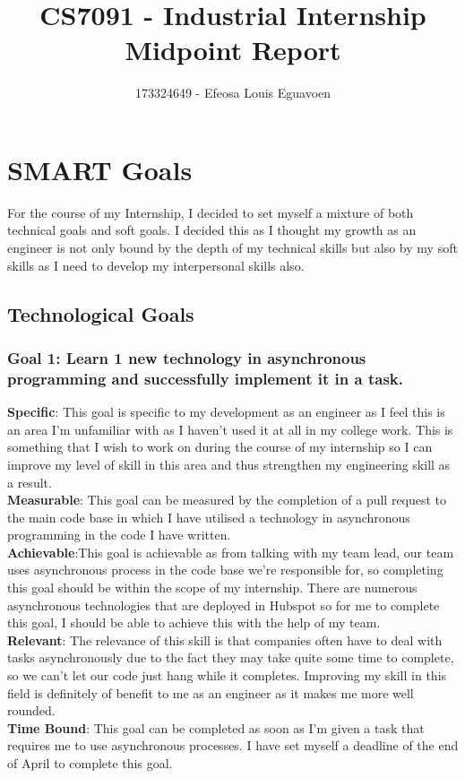 \documentclass[12pt]{article} %
\title{CS7091 - Industrial Internship Midpoint Report}
\author{173324649 - Efeosa Louis Eguavoen}
\begin{document}
\maketitle

\section{SMART Goals}
For the course of my Internship, I decided to set myself a mixture of both technical goals and soft goals. I decided this as I thought my growth as an engineer is not only bound by the depth of my technical skills but also by my soft skills as I need to develop my interpersonal skills also.

\subsection{Technological Goals}
\subsubsection{Goal 1: Learn 1 new technology in asynchronous programming and successfully implement it in a task.}
\textbf{Specific}: This goal is specific to my development as an engineer as I feel this is an area I'm unfamiliar with as I haven't used it at all in my college work.  This is something that I wish to work on during the course of my internship so I can improve my level of skill in this area and thus strengthen my engineering skill as a result. 
\\ \textbf{Measurable}: This goal can be measured by the completion of a pull request to the main code base in which I have utilised a technology in asynchronous programming in the code I have written. 
\\ \textbf{Achievable}:This goal is achievable as from talking with my team lead,  our team uses asynchronous process in the code base we're responsible for,  so completing this goal should be within the scope of my internship.  There are numerous asynchronous technologies that are deployed in Hubspot so for me to complete this goal, I should be able to achieve this with the help of my team.
\\ \textbf{Relevant}: The relevance of this skill is that companies often have to deal with tasks asynchronously due to the fact they may take quite some time to complete,  so we can't let our code just hang while it completes.  Improving my skill in this field is definitely of benefit to me as an engineer as it makes me more well rounded. 
\\ \textbf{Time Bound}: This goal can be completed as soon as I'm given a task that requires me to use asynchronous processes.  I have set myself a deadline of the end of April to complete this goal. 
\end{document}
